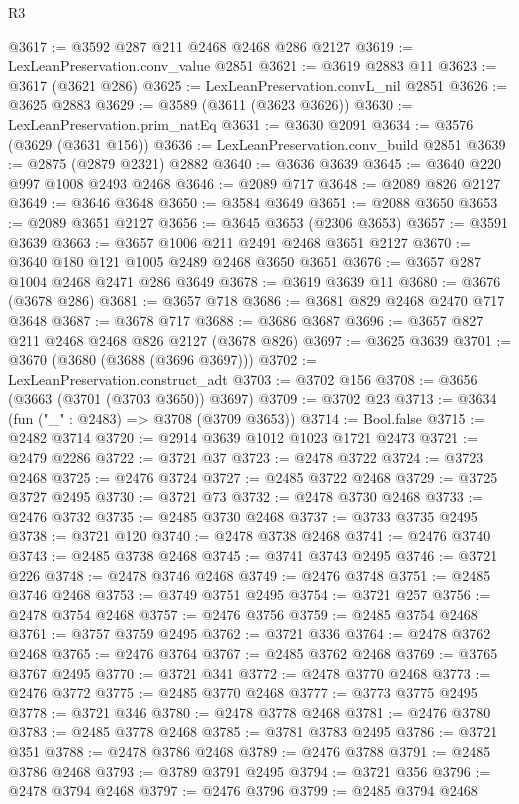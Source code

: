 \begin{lexlean}{R3}
\begin{coremodule}
@3617 := @3592 @287 @211 @2468 @2468 @286 @2127
@3619 := LexLeanPreservation.conv_value @2851
@3621 := @3619 @2883 @11
@3623 := @3617 (@3621 @286)
@3625 := LexLeanPreservation.convL_nil @2851
@3626 := @3625 @2883
@3629 := @3589 (@3611 (@3623 @3626))
@3630 := LexLeanPreservation.prim_natEq
@3631 := @3630 @2091
@3634 := @3576 (@3629 (@3631 @156))
@3636 := LexLeanPreservation.conv_build @2851
@3639 := @2875 (@2879 @2321) @2882
@3640 := @3636 @3639
@3645 := @3640 @220 @997 @1008 @2493 @2468
@3646 := @2089 @717
@3648 := @2089 @826 @2127
@3649 := @3646 @3648
@3650 := @3584 @3649
@3651 := @2088 @3650
@3653 := @2089 @3651 @2127
@3656 := @3645 @3653 (@2306 @3653)
@3657 := @3591 @3639
@3663 := @3657 @1006 @211 @2491 @2468 @3651 @2127
@3670 := @3640 @180 @121 @1005 @2489 @2468 @3650 @3651
@3676 := @3657 @287 @1004 @2468 @2471 @286 @3649
@3678 := @3619 @3639 @11
@3680 := @3676 (@3678 @286)
@3681 := @3657 @718
@3686 := @3681 @829 @2468 @2470 @717 @3648
@3687 := @3678 @717
@3688 := @3686 @3687
@3696 := @3657 @827 @211 @2468 @2468 @826 @2127 (@3678 @826)
@3697 := @3625 @3639
@3701 := @3670 (@3680 (@3688 (@3696 @3697)))
@3702 := LexLeanPreservation.construct_adt
@3703 := @3702 @156
@3708 := @3656 (@3663 (@3701 (@3703 @3650)) @3697)
@3709 := @3702 @23
@3713 := @3634 (fun ("_" : @2483) => @3708 (@3709 @3653))
@3714 := Bool.false
@3715 := @2482 @3714
@3720 := @2914 @3639 @1012 @1023 @1721 @2473
@3721 := @2479 @2286
@3722 := @3721 @37
@3723 := @2478 @3722
@3724 := @3723 @2468
@3725 := @2476 @3724
@3727 := @2485 @3722 @2468
@3729 := @3725 @3727 @2495
@3730 := @3721 @73
@3732 := @2478 @3730 @2468
@3733 := @2476 @3732
@3735 := @2485 @3730 @2468
@3737 := @3733 @3735 @2495
@3738 := @3721 @120
@3740 := @2478 @3738 @2468
@3741 := @2476 @3740
@3743 := @2485 @3738 @2468
@3745 := @3741 @3743 @2495
@3746 := @3721 @226
@3748 := @2478 @3746 @2468
@3749 := @2476 @3748
@3751 := @2485 @3746 @2468
@3753 := @3749 @3751 @2495
@3754 := @3721 @257
@3756 := @2478 @3754 @2468
@3757 := @2476 @3756
@3759 := @2485 @3754 @2468
@3761 := @3757 @3759 @2495
@3762 := @3721 @336
@3764 := @2478 @3762 @2468
@3765 := @2476 @3764
@3767 := @2485 @3762 @2468
@3769 := @3765 @3767 @2495
@3770 := @3721 @341
@3772 := @2478 @3770 @2468
@3773 := @2476 @3772
@3775 := @2485 @3770 @2468
@3777 := @3773 @3775 @2495
@3778 := @3721 @346
@3780 := @2478 @3778 @2468
@3781 := @2476 @3780
@3783 := @2485 @3778 @2468
@3785 := @3781 @3783 @2495
@3786 := @3721 @351
@3788 := @2478 @3786 @2468
@3789 := @2476 @3788
@3791 := @2485 @3786 @2468
@3793 := @3789 @3791 @2495
@3794 := @3721 @356
@3796 := @2478 @3794 @2468
@3797 := @2476 @3796
@3799 := @2485 @3794 @2468

\end{coremodule}
\end{lexlean}

